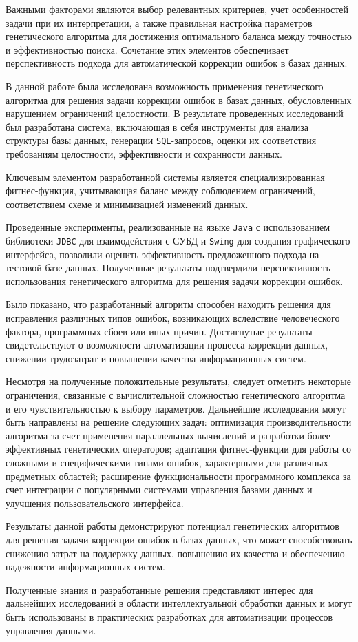 \documentclass[master,paper]{pmk-graduate}
\begin{document}
Важными факторами являются выбор релевантных критериев, учет особенностей задачи при их интерпретации, а также правильная настройка параметров генетического алгоритма для достижения оптимального баланса между точностью и эффективностью поиска. Сочетание этих элементов обеспечивает перспективность подхода для автоматической коррекции ошибок в базах данных.

\conclusion
В данной работе была исследована возможность применения генетичес\-кого алгоритма для решения задачи коррекции ошибок в базах данных, обус\-ловленных нарушением ограничений целостности. В результате проведенных исследований был разработана система, включающая в себя инструменты для анализа структуры базы данных, генерации \texttt{SQL}-запросов, оценки их соответст\-вия требованиям целостности, эффективности и сохранности данных. 

Ключевым элементом разработанной системы является специализированная фитнес-функция, учитывающая баланс между соблюдением ограничений, соответствием схеме и минимизацией изменений данных.

Проведенные эксперименты, реализованные на языке \texttt{Java} с использованием библиотеки \texttt{JDBC} для взаимодействия с СУБД и \texttt{Swing} для создания графического интерфейса, позволили оценить эффективность предложенного подхода на тестовой базе данных. Полученные результаты подтвердили перспективность использования генетического алгоритма для решения задачи коррекции ошибок. 


Было показано, что разработанный алгоритм способен находить решения для исправления различных типов ошибок, возникающих вследствие человеческого фактора, программных сбоев или иных причин. Достигнутые результаты свидетельствуют о возможности автоматизации процесса коррекции данных, снижении трудозатрат и повышении качества информационных систем.

Несмотря на полученные положительные результаты, следует отметить некоторые ограничения, связанные с вычислительной сложностью генетичес\-кого алгоритма и его чувствительностью к выбору параметров. Дальнейшие исследования могут быть направлены на решение следующих задач: оптимизация производительности алгоритма за счет применения параллельных вычислений и разработки более эффективных генетических операторов; адаптация фитнес-функции для работы со сложными и специфическими типами ошибок, характерными для различных предметных областей; расширение функциональности программного комплекса за счет интеграции с популярными системами управления базами данных и улучшения пользовательского интерфейса.

Результаты данной работы демонстрируют потенциал генетических алгоритмов для решения задачи коррекции ошибок в базах данных, что может способствовать снижению затрат на поддержку данных, повышению их качества и обеспечению надежности информационных систем. 

Полученные знания и разработанные решения представляют интерес для дальнейших исследований в области интеллектуальной обработки данных и могут быть использованы в практических разработках для автоматизации процессов управления данными.

\printthebibliography
\end{document}
